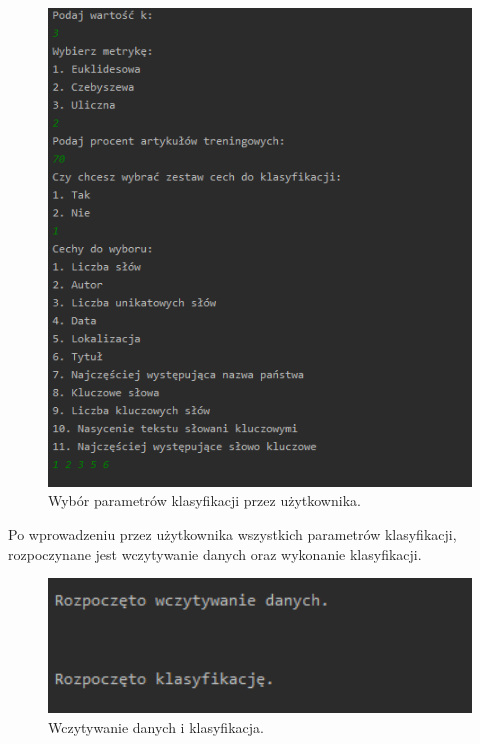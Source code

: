 \documentclass{classrep}
\begin{document}
\begin{figure}[h!]
 \centering
 \includegraphics[width=14cm]{Wybor.png}
 \vspace{-0.3cm}
 \caption{Wybór parametrów klasyfikacji przez użytkownika. }
 \label{Wybór parametrów klasyfikacji przez użytkownika. }
\end{figure}

\newpage
Po wprowadzeniu przez użytkownika wszystkich parametrów klasyfikacji, rozpoczynane jest wczytywanie danych oraz wykonanie klasyfikacji. 
\begin{figure}[h!]
 \centering
 \includegraphics[width=14cm]{srodek.png}
 \vspace{-0.3cm}
 \caption{Wczytywanie danych i klasyfikacja.}
 \label{Wczytywanie danych i klasyfikacja.}
\end{figure}
\end{document}
